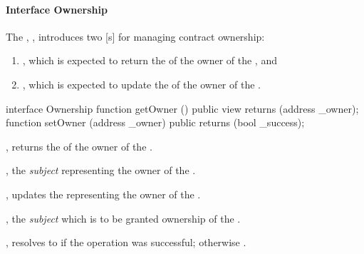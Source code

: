 \paragraph{Interface Ownership}

The , , introduces two
[s] for managing contract ownership:

\begin{enumerate}
  \item {}, which is expected to return the 
        of the owner of the , and
  \item {}, which is expected to update the 
        of the owner of the .
\end{enumerate}

\begin{solidity}
interface Ownership {
  function getOwner () public view returns (address _owner);
  function setOwner (address _owner) public returns (bool _success);
}
\end{solidity}

\begin{interface}
  \begin{functions}
    \item {}, returns the  of the owner of
      the .

      \begin{returns}
        \item {}, the \emph{subject} representing the owner of
          the .
      \end{returns}

    \item {}, updates the 
      representing the owner of the .



      \begin{parameters}
      \item {}, the \emph{subject} which is to be granted
        ownership of the .\footnotemark{}

      \end{parameters}

      \begin{returns}
      \item {}, resolves to  if the operation was
        successful; otherwise .
      \end{returns}
  \end{functions}
\end{interface}
